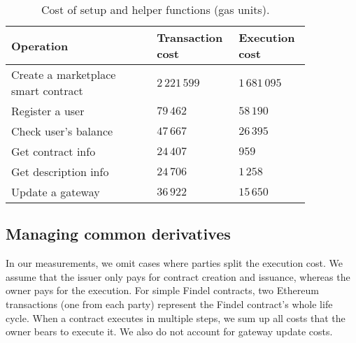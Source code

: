 \begin{table}
	\centering
	\caption{Cost of setup and helper functions (gas units).}
	\begin{tabular}{| p{0.45\linewidth} | p{0.2\linewidth} | p{0.2\linewidth} |}
		\hline
		\textbf{Operation} & \textbf{Transaction cost} & \textbf{Execution cost} \\
		\hline
		Create a marketplace smart contract & $2\,221\,599$ & $1\,681\,095$ \\
		\hline
		Register a user & $79\,462$ & $58\,190$ \\
		\hline
		Check user's balance & $47\,667$ & $26\,395$ \\
		\hline
		Get contract info & $24\,407$ & $959$ \\
		\hline
		Get description info & $24\,706$ & $1\,258$ \\
		\hline
		Update a gateway & $36\,922$ & $15\,650$ \\
		\hline
	\end{tabular}
	\label{tab:Ch10FindelCost}
\end{table}


\subsection{Managing common derivatives}

In our measurements, we omit cases where parties split the execution cost.
We assume that the issuer only pays for contract creation and issuance, whereas the owner pays for the execution.
For simple Findel contracts, two Ethereum transactions (one from each party) represent the Findel contract's whole life cycle.
When a contract executes in multiple steps, we sum up all costs that the owner bears to execute it.
We also do not account for gateway update costs.

